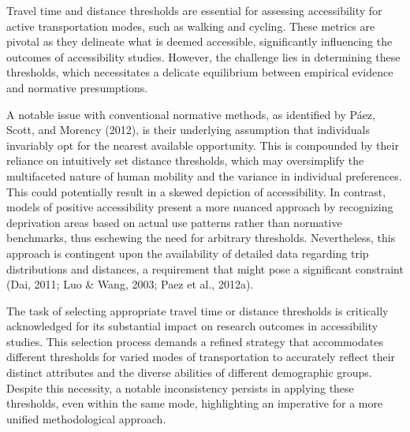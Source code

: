 \documentclass[
11pt, %
oneside, %
english, %
singlespacing, %
]{macthesis} %
\begin{document}
Travel time and distance thresholds are essential for assessing accessibility for active transportation modes, such as walking and cycling. These metrics are pivotal as they delineate what is deemed accessible, significantly influencing the outcomes of accessibility studies. However, the challenge lies in determining these thresholds, which necessitates a delicate equilibrium between empirical evidence and normative presumptions.

A notable issue with conventional normative methods, as identified by Páez, Scott, and Morency (2012), is their underlying assumption that individuals invariably opt for the nearest available opportunity. This is compounded by their reliance on intuitively set distance thresholds, which may oversimplify the multifaceted nature of human mobility and the variance in individual preferences. This could potentially result in a skewed depiction of accessibility. In contrast, models of positive accessibility present a more nuanced approach by recognizing deprivation areas based on actual use patterns rather than normative benchmarks, thus eschewing the need for arbitrary thresholds. Nevertheless, this approach is contingent upon the availability of detailed data regarding trip distributions and distances, a requirement that might pose a significant constraint (Dai, 2011; Luo \& Wang, 2003; Paez et al., 2012a).

The task of selecting appropriate travel time or distance thresholds is critically acknowledged for its substantial impact on research outcomes in accessibility studies. This selection process demands a refined strategy that accommodates different thresholds for varied modes of transportation to accurately reflect their distinct attributes and the diverse abilities of different demographic groups. Despite this necessity, a notable inconsistency persists in applying these thresholds, even within the same mode, highlighting an imperative for a more unified methodological approach.
\end{document}
